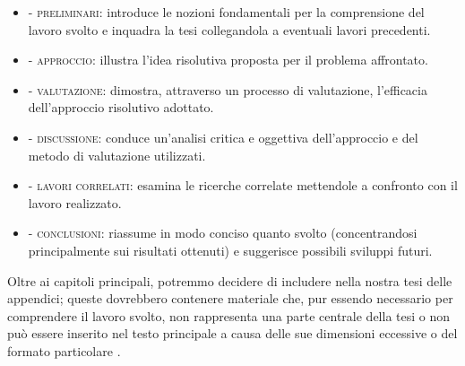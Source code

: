 \begin{itemize}

\item {} - \textsc{preliminari}:
introduce le nozioni fondamentali per la comprensione del lavoro svolto e inquadra la tesi collegandola a eventuali lavori precedenti.

\item {} - \textsc{approccio}:
illustra l'idea risolutiva proposta per il problema affrontato.

\item {} - \textsc{valutazione}:
dimostra, attraverso un processo di valutazione, l'efficacia dell'approccio risolutivo adottato.

\item {} - \textsc{discussione}:
conduce un'analisi critica e oggettiva dell'approccio e del metodo di valutazione utilizzati.

\item {} - \textsc{lavori correlati}:
esamina le ricerche correlate mettendole a confronto con il lavoro realizzato.

\item {} - \textsc{conclusioni}:
riassume in modo conciso quanto svolto (concentrandosi principalmente sui risultati ottenuti) e suggerisce possibili sviluppi futuri.

\end{itemize}

Oltre ai capitoli principali, potremmo decidere di includere nella nostra tesi delle appendici; 
queste dovrebbero contenere materiale che, pur essendo necessario per comprendere il lavoro svolto, non rappresenta una parte centrale della tesi o non può essere inserito nel testo principale a causa delle sue dimensioni eccessive o del formato particolare \cite{tuni2019guide}.

